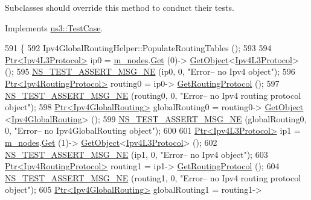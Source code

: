 Subclasses should override this method to conduct their tests. 

Implements \hyperlink{classns3_1_1TestCase_a8ff74680cf017ed42011e4be51917a24}{ns3\+::\+Test\+Case}.


\begin{DoxyCode}
591 \{
592   Ipv4GlobalRoutingHelper::PopulateRoutingTables ();
593 
594   \hyperlink{classns3_1_1Ptr}{Ptr<Ipv4L3Protocol>} ip0 = \hyperlink{classBridgeTest_af539673ded293faf900a2202eeb0dbb0}{m\_nodes}.\hyperlink{classns3_1_1NodeContainer_a9ed96e2ecc22e0f5a3d4842eb9bf90bf}{Get} (0)->
      \hyperlink{classns3_1_1Object_a13e18c00017096c8381eb651d5bd0783}{GetObject}<\hyperlink{classns3_1_1Ipv4L3Protocol}{Ipv4L3Protocol}> ();
595   \hyperlink{group__testing_ga73d66fb0050a5111453fd144e767b91a}{NS\_TEST\_ASSERT\_MSG\_NE} (ip0, 0, \textcolor{stringliteral}{"Error-- no Ipv4 object"});  
596   \hyperlink{classns3_1_1Ptr}{Ptr<Ipv4RoutingProtocol>} routing0 = ip0->
      \hyperlink{classns3_1_1Ipv4L3Protocol_aa1e4efbf4978299e47406895c3f4b41d}{GetRoutingProtocol} ();
597   \hyperlink{group__testing_ga73d66fb0050a5111453fd144e767b91a}{NS\_TEST\_ASSERT\_MSG\_NE} (routing0, 0, \textcolor{stringliteral}{"Error-- no Ipv4 routing protocol object"});  
598   \hyperlink{classns3_1_1Ptr}{Ptr<Ipv4GlobalRouting>} globalRouting0 = routing0->
      \hyperlink{classns3_1_1Object_a13e18c00017096c8381eb651d5bd0783}{GetObject} <\hyperlink{classns3_1_1Ipv4GlobalRouting}{Ipv4GlobalRouting}> ();
599   \hyperlink{group__testing_ga73d66fb0050a5111453fd144e767b91a}{NS\_TEST\_ASSERT\_MSG\_NE} (globalRouting0, 0, \textcolor{stringliteral}{"Error-- no Ipv4GlobalRouting object"});  
600 
601   \hyperlink{classns3_1_1Ptr}{Ptr<Ipv4L3Protocol>} ip1 = \hyperlink{classBridgeTest_af539673ded293faf900a2202eeb0dbb0}{m\_nodes}.\hyperlink{classns3_1_1NodeContainer_a9ed96e2ecc22e0f5a3d4842eb9bf90bf}{Get} (1)->
      \hyperlink{classns3_1_1Object_a13e18c00017096c8381eb651d5bd0783}{GetObject}<\hyperlink{classns3_1_1Ipv4L3Protocol}{Ipv4L3Protocol}> ();
602   \hyperlink{group__testing_ga73d66fb0050a5111453fd144e767b91a}{NS\_TEST\_ASSERT\_MSG\_NE} (ip1, 0, \textcolor{stringliteral}{"Error-- no Ipv4 object"});  
603   \hyperlink{classns3_1_1Ptr}{Ptr<Ipv4RoutingProtocol>} routing1 = ip1->
      \hyperlink{classns3_1_1Ipv4L3Protocol_aa1e4efbf4978299e47406895c3f4b41d}{GetRoutingProtocol} ();
604   \hyperlink{group__testing_ga73d66fb0050a5111453fd144e767b91a}{NS\_TEST\_ASSERT\_MSG\_NE} (routing1, 0, \textcolor{stringliteral}{"Error-- no Ipv4 routing protocol object"});  
605   \hyperlink{classns3_1_1Ptr}{Ptr<Ipv4GlobalRouting>} globalRouting1 = routing1->

\end{DoxyCode}
